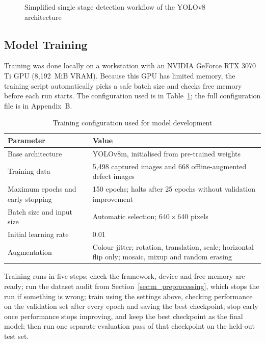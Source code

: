 \begin{figure}[H]
\centering
{}
\caption{Simplified single stage detection workflow of the YOLOv8 architecture}
\label{fig:yolo}
\end{figure}

\subsection{Model Training}
\label{sec:m_training}

Training was done locally on a workstation with an NVIDIA GeForce RTX 3070 Ti \acrshort{GPU} (8{,}192~\acrshort{MiB} \acrshort{VRAM}). Because this GPU has limited memory, the training script automatically picks a safe batch size and checks free memory before each run starts. The configuration used is in Table~\ref{tab:training}; the full configuration file is in Appendix~B.

\begin{table}[H]
\caption{Training configuration used for model development}
\label{tab:training}
\centering
\begin{tabularx}{\textwidth}{p{5.4cm} X}
\toprule
\textbf{Parameter} & \textbf{Value} \\
\midrule
Base architecture & YOLOv8m, initialised from pre-trained weights \\
Training data & 5{,}498 captured images and 668 offline-augmented defect images \\
Maximum epochs and early stopping & 150 epochs; halts after 25 epochs without validation improvement \\
Batch size and input size & Automatic selection; 640\,$\times$\,640 pixels \\
Initial learning rate & 0.01 \\
Augmentation & Colour jitter; rotation, translation, scale; horizontal flip only; mosaic, mixup and random erasing \\
\bottomrule
\end{tabularx}
\end{table}

Training runs in five steps: check the framework, device and free memory are ready; run the dataset audit from Section~\ref{sec:m_preprocessing}, which stops the run if something is wrong; train using the settings above, checking performance on the validation set after every epoch and saving the best checkpoint; stop early once performance stops improving, and keep the best checkpoint as the final model; then run one separate evaluation pass of that checkpoint on the held-out test set.

